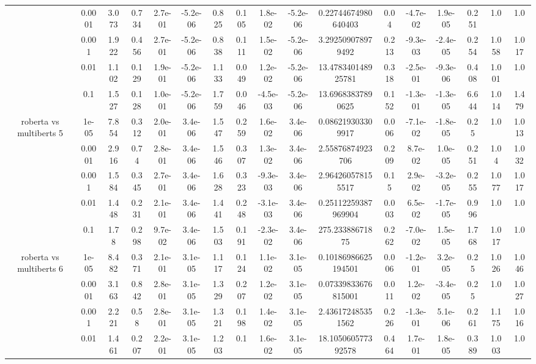 \begin{tabular}{|c|c|c|c|c|c|c|c|c|c|c|c|c|c|c|c|c|}
 & 0.0001 & 3.073 & 0.734 & 2.7e-01 & -5.2e-06 & 0.825 & 0.105 & 1.8e-02 & -5.2e-06 & 0.22744674980640403 & 0.04 & -4.7e-02 & 1.9e-05 & 0.251 & 1.0 & 1.0 \\
 & 0.001 & 1.922 & 0.456 & 2.7e-01 & -5.2e-06 & 0.838 & 0.111 & 1.5e-02 & -5.2e-06 & 3.292509078979492 & 0.213 & -9.3e-03 & -2.4e-05 & 0.254 & 1.058 & 1.017 \\
 & 0.01 & 1.102 & 0.129 & 1.9e-01 & -5.2e-06 & 1.133 & 0.049 & 1.2e-02 & -5.2e-06 & 13.478340148925781 & 0.318 & -2.5e-01 & -9.3e-06 & 0.408 & 1.001 & 1.0 \\
 & 0.1 & 1.527 & 0.128 & 1.0e-01 & -5.2e-06 & 1.759 & 0.046 & -4.5e-03 & -5.2e-06 & 13.69683837890625 & 0.152 & -1.3e-01 & -1.3e-05 & 6.644 & 1.014 & 1.479 \\
\hline
\multirow{5}{*}{roberta  vs multiberts 5} & 1e-05 & 7.854 & 0.312 & 2.0e-01 & 3.4e-06 & 1.547 & 0.259 & 1.6e-02 & 3.4e-06 & 0.086219303309917 & 0.006 & -7.1e-02 & -1.8e-05 & 0.25 & 1.0 & 1.013 \\
 & 0.0001 & 2.916 & 0.74 & 2.8e-01 & 3.4e-06 & 1.546 & 0.307 & 1.3e-02 & 3.4e-06 & 2.55876874923706 & 0.209 & 8.7e-02 & 1.0e-05 & 0.251 & 1.04 & 1.032 \\
 & 0.001 & 1.584 & 0.345 & 2.7e-01 & 3.4e-06 & 1.628 & 0.323 & -9.3e-03 & 3.4e-06 & 2.964260578155517 & 0.15 & 2.9e-02 & -3.2e-05 & 0.255 & 1.077 & 1.017 \\
 & 0.01 & 1.448 & 0.231 & 2.1e-01 & 3.4e-06 & 1.441 & 0.248 & -3.1e-03 & 3.4e-06 & 0.25112259387969904 & 0.003 & 6.5e-02 & -1.7e-05 & 0.996 & 1.0 & 1.0 \\
 & 0.1 & 1.78 & 0.298 & 9.7e-02 & 3.4e-06 & 1.503 & 0.191 & -2.3e-02 & 3.4e-06 & 275.23388671875 & 0.262 & -7.0e-02 & 1.5e-05 & 1.768 & 1.017 & 1.0 \\
\hline
\multirow{5}{*}{roberta  vs multiberts 6} & 1e-05 & 8.482 & 0.371 & 2.1e-01 & 3.1e-05 & 1.117 & 0.124 & 1.1e-02 & 3.1e-05 & 0.10186986625194501 & 0.006 & -1.2e-01 & 3.2e-05 & 0.25 & 1.026 & 1.046 \\
 & 0.0001 & 3.163 & 0.842 & 2.8e-01 & 3.1e-05 & 1.329 & 0.207 & 1.2e-02 & 3.1e-05 & 0.07339833676815001 & 0.011 & 1.2e-02 & -3.4e-05 & 0.25 & 1.0 & 1.027 \\
 & 0.001 & 2.221 & 0.58 & 2.8e-01 & 3.1e-05 & 1.321 & 0.198 & 1.4e-02 & 3.1e-05 & 2.436172485351562 & 0.226 & -1.3e-01 & 5.1e-06 & 0.261 & 1.175 & 1.016 \\
 & 0.01 & 1.461 & 0.207 & 2.2e-01 & 3.1e-05 & 1.203 & 0.1 & 1.6e-02 & 3.1e-05 & 18.105060577392578 & 0.464 & 1.7e-01 & 1.8e-05 & 0.389 & 1.003 & 1.0 \\

\end{tabular}
